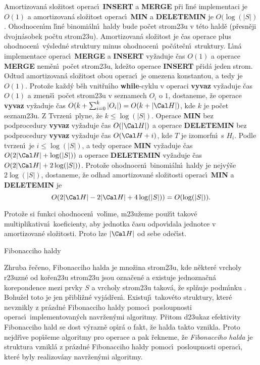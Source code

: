 \flushpar Amortizovan\'a slo\v zitost operac\'\i\ 
{\bf INSERT} a {\bf MER\-GE} p\v ri l\'\i n\'e implementaci je $O
(1)$ a 
amortizovan\'a slo\v zitost operac\'\i\ {\bf MIN} a {\bf DELETEMIN  }
je $O(\log(|S|)$. Ohodnocen\'\i m l\'\i n\'e 
binomi\'aln\'\i\ haldy bude po\v cet strom\accent23u v t\'eto 
hald\v e (p\v resn\v eji dvojn\'asobek po\v ctu strom\accent23u). 
Amortizovan\'a slo\v zitost je \v cas operace plus 
ohodnocen\'\i\ v\'ysledn\'e struktury minus ohodnocen\'\i\ 
po\v c\'ate\v cn\'\i\ struktury. L\'\i n\'a implementace operac\'\i\ {\bf MER\-GE} a {\bf INSERT  }
vy\v zaduje \v cas $O(1)$ a operace {\bf MERGE} nem\v e\-n\'\i\ 
po\v cet strom\accent23u, kde\v zto operace {\bf INSERT} p\v rid\'a jeden 
strom. Odtud amortizovan\'a slo\v zitost obou operac\'\i\ je 
omezena kons\-tantou, a tedy je $O(1)$. Proto\v ze ka\v zd\'y b\v eh 
vnit\v rn\'\i ho {\bf while}-cyklu v operaci {\bf vyvaz} vy\v zaduje \v cas $
O(1)$ 
a zmen\v s\'\i\ po\v cet stro\-m\accent23u v seznamech $O_i$ o $1$, 
dostaneme, \v ze ope\-ra\-ce {\bf vyvaz} vy\v zaduje \v cas $O(k+\sum_{i=0}^k|O_i|
)=O(k+|\Cal H|)$, kde $k$ je po\v cet 
seznam\accent23u. Z Tvrzen\'\i\ plyne, \v ze $k\le\log(|S|)$. Ope\-ra\-ce {\bf MIN}
bez podprocedury {\bf vyvaz} vy\v zaduje \v cas $O(|\Cal H|)$ a operace 
{\bf DE\-LE\-TEMIN} bez podprocedury {\bf vyvaz} vy\v zaduje \v cas $
O(\Cal H+i)$, 
kde $T$ je izomorfn\'\i\ s $H_i$. Podle tvrzen\'\i\ je $i\le\log(
|S|)$, a 
tedy ope\-ra\-ce {\bf MIN} vy\v zaduje \v cas $O(2|\Cal H|+\log(|S|))$ a ope\-race 
{\bf DE\-LE\-TEMIN} vy\-\v zaduje \v cas $O(2|\Cal H|+2\log(|S|))$. Proto\v ze  
ohodnocen\'\i\ binomi\'aln\'\i\ haldy je nejv\'y\v se $2\log(|S|)$, 
dostaneme, \v ze odhad  
amortizovan\'e slo\v zitosti operac\'\i\ {\bf MIN} a {\bf DELETEMIN} je
$$O(2|\Cal H|-2|\Cal H|+4\log(|S|))=O(\log(|S|)).$$
\medskip

\flushpar Proto\v ze si funkci ohodnocen\'\i\ vol\'\i me, 
m\accent23u\v zeme pou\v z\'\i t takov\'e multiplikativn\'\i\ 
koeficienty, aby jednotka \v casu odpov\'\i dala jednotce v 
amortizovan\'e slo\v zitosti. Proto lze $|\Cal H|$ od sebe ode\v c\'\i st.

\heading
Fibonacciho haldy
\endheading

\flushpar Zhruba \v re\v ceno, Fibonacciho halda je mno\v zina 
strom\accent23u, kde n\v ekter\'e vrcholy r\accent23uzn\'e od 
ko\v ren\accent23u strom\accent23u jsou ozna\v cen\'e a existuje 
jednozna\v cn\'a korepondence mezi prvky $S$ a vrcholy 
strom\accent23u takov\'a, \v ze spl\v nuje podm\'\i nku 
\thetag{usp}. Bohu\v zel toto je jen p\v ribli\v z\-n\'e vyj\'ad\v ren\'\i . 
Existuj\'\i\ takov\'eto struktury, kter\'e nevznikly z pr\'azd\-n\'e 
Fibonacciho haldy pomoc\'\i\ posloupnosti ope\-rac\'\i\ 
implementovan\'ych navr\v zen\'ymi algoritmy. P\v ritom 
d\accent23ukaz efekti\-vity Fibonacciho hald se dost 
v\'yrazn\v e op\'\i r\'a o fakt, \v ze halda takto vznikla. Proto 
nejd\v r\'\i ve pop\'\i\v seme algoritmy pro operace a pak \v rekneme, 
\v ze \emph{Fibonacciho} \emph{halda} je struktura vznikl\'a 
z pr\'azdn\'e Fibonacciho haldy pomoc\'\i\ posloupnosti operac\'\i , 
kter\'e byly realizov\'any navr\v zen\'ymi algoritmy.
\medskip

